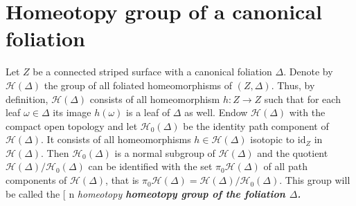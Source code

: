 \documentclass[12pt, reqno]{amsart}
\makeatletter
\def\myemphInternal#1{\if n\f@shape%
\begingroup\itshape #1\endgroup\/%
\else\begingroup\bfseries #1\endgroup%
\fi}
\def\myemph{\futurelet\testchar\MaybeOptArgmyemph}
\def\MaybeOptArgmyemph{\ifx[\testchar \let\next\OptArgmyemph
                 \else \let\next\NoOptArgmyemph \fi \next}
\def\OptArgmyemph[#1]#2{\index{#1}\myemphInternal{#2}}
\def\NoOptArgmyemph#1{\myemphInternal{#1}}
\newcommand\dif{h}
\newcommand{\Partition}{\Delta}
\newcommand{\stripSurf}{Z}
\newcommand{\id}{\mathrm{id}}
\newcommand\Homeo{\mathcal{H}}
\makeatother
\begin{document}
\section{Homeotopy group of a canonical foliation}\label{sect:homeotopy_group}
Let $\stripSurf$ be a connected striped surface with a canonical foliation $\Partition$.
Denote by $\Homeo(\Partition)$ the group of all foliated homeomorphisms of $(\stripSurf,\Partition)$.
Thus, by definition, $\Homeo(\Partition)$ consists of all homeomorphism $\dif:\stripSurf\to\stripSurf$ such that for each leaf $\omega\in\Partition$ its image $\dif(\omega)$ is a leaf of $\Partition$ as well.
Endow $\Homeo(\Partition)$ with the compact open topology and let $\Homeo_0(\Partition)$ be the identity path component of $\Homeo(\Partition)$.
It consists of all homeomorphisms $\dif\in\Homeo(\Partition)$ isotopic to $\id_{\stripSurf}$ in $\Homeo(\Partition)$.
Then $\Homeo_0(\Partition)$ is a normal subgroup of $\Homeo(\Partition)$ and the quotient $\Homeo(\Partition) /\Homeo_0(\Partition)$ can be identified with the set $\pi_0\Homeo(\Partition)$ of all path components of $\Homeo(\Partition)$, that is $\pi_0\Homeo(\Partition) = \Homeo(\Partition) / \Homeo_0(\Partition)$.
This group will be called the \myemph{homeotopy} group of the foliation $\Partition$.
\end{document}
